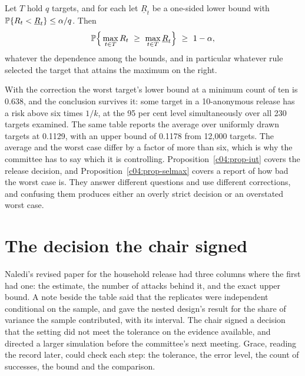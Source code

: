 \begin{proposition}\label{c04:prop-selmax}
Let $T$ hold $q$ targets, and for each let $\underline{R}_t$ be a one-sided lower bound
with $\mathbb{P}\{R_t < \underline{R}_t\} \le \alpha/q$. Then
\begin{equation}\label{c04:eq-bonf}
\mathbb{P}\Big\{\max_{t \in T} R_t \ \ge\ \max_{t \in T}\underline{R}_t\Big\} \ \ge\ 1-\alpha,
\end{equation}
whatever the dependence among the bounds, and in particular whatever rule selected the
target that attains the maximum on the right.
\end{proposition}

With the correction the worst target's lower bound at a minimum count of ten is 0.638,
and the conclusion survives it: some target in a 10-anonymous release has a risk above
six times $1/k$, at the 95 per cent level simultaneously over all 230 targets examined.
The same table reports the average over uniformly drawn targets at 0.1129, with an upper
bound of 0.1178 from 12,000 targets.
The average and the worst case differ by a factor of more than six, which is why the
committee has to say which it is controlling. Proposition~\ref{c04:prop-iut} covers the
release decision, and Proposition~\ref{c04:prop-selmax} covers a report of how bad the
worst case is. They answer different questions and use different corrections, and
confusing them produces either an overly strict decision or an overstated worst case.

\section{The decision the chair signed}

Naledi's revised paper for the household release had three columns where the first had
one: the estimate, the number of attacks behind it, and the exact upper bound. A note
beside the table said that the replicates were independent conditional on the sample, and
gave the nested design's result for the share of variance the sample contributed, with its
interval. The chair signed a decision that the setting did not meet the tolerance on the
evidence available, and directed a larger simulation before the committee's next meeting.
Grace, reading the record later, could check each step: the tolerance, the error level,
the count of successes, the bound and the comparison.

